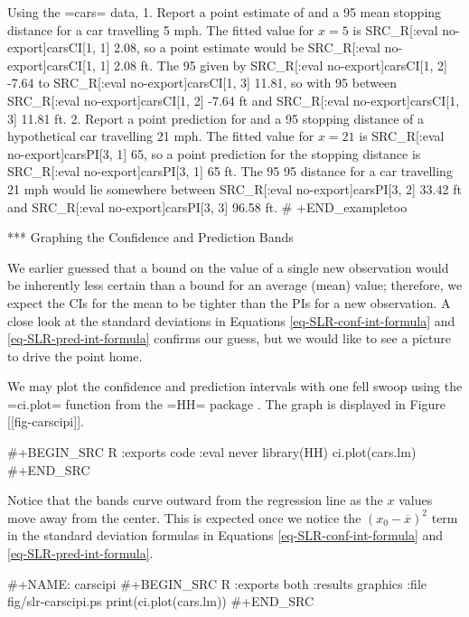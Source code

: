 Using the =cars= data,
1. Report a point estimate of and a 95%
   mean stopping distance for a car travelling 5 mph.  The fitted
   value for \(x = 5\) is SRC_R[:eval no-export]{carsCI[1, 1]} 2.08, so a point
   estimate would be SRC_R[:eval no-export]{carsCI[1, 1]} 2.08 ft. The 95%
   given by SRC_R[:eval no-export]{carsCI[1, 2]} -7.64 to SRC_R[:eval no-export]{carsCI[1, 3]} 11.81, so
   with 95%
   between SRC_R[:eval no-export]{carsCI[1, 2]} -7.64 ft and SRC_R[:eval no-export]{carsCI[1, 3]} 11.81 ft.
2. Report a point prediction for and a 95%
   stopping distance of a hypothetical car travelling 21 mph.  The
   fitted value for \(x = 21\) is SRC_R[:eval no-export]{carsPI[3, 1]} 65, so a point
   prediction for the stopping distance is SRC_R[:eval no-export]{carsPI[3, 1]} 65 ft. The
   95%
   95%
   distance for a car travelling 21 mph would lie somewhere between
   SRC_R[:eval no-export]{carsPI[3, 2]} 33.42 ft and SRC_R[:eval no-export]{carsPI[3, 3]} 96.58 ft.
# +END_exampletoo

*** Graphing the Confidence and Prediction Bands

We earlier guessed that a bound on the value of a single new
observation would be inherently less certain than a bound for an
average (mean) value; therefore, we expect the CIs for the mean to be
tighter than the PIs for a new observation. A close look at the
standard deviations in Equations \eqref{eq-SLR-conf-int-formula} and
\eqref{eq-SLR-pred-int-formula} confirms our guess, but we would like
to see a picture to drive the point home.

We may plot the confidence and prediction intervals with one fell
swoop using the =ci.plot= function from the =HH= package
\cite{HH}. The graph is displayed in Figure [[fig-carscipi]].

#+BEGIN_SRC R :exports code :eval never
library(HH)
ci.plot(cars.lm)
#+END_SRC

Notice that the bands curve outward from the regression line as the
\(x\) values move away from the center. This is expected once we
notice the \((x_{0}-\overline{x})^{2}\) term in the standard deviation
formulas in Equations \eqref{eq-SLR-conf-int-formula} and
\eqref{eq-SLR-pred-int-formula}.

#+NAME: carscipi
#+BEGIN_SRC R :exports both :results graphics :file fig/slr-carscipi.ps
print(ci.plot(cars.lm))
#+END_SRC

